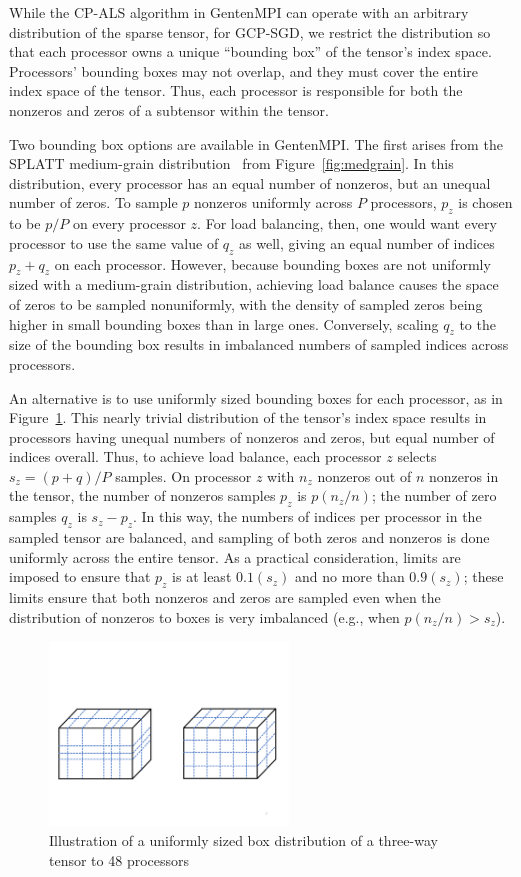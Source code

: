While the CP-ALS algorithm in GentenMPI can operate with an arbitrary 
distribution of the sparse tensor, for GCP-SGD, we restrict the distribution
so that each processor owns a unique ``bounding box'' of the tensor's
index space.  Processors' bounding boxes may not overlap, and they must cover
the entire index space of the tensor.  Thus, each processor is responsible
for both the nonzeros and zeros of a subtensor within the tensor.

Two bounding box options are available in GentenMPI.  The first arises from
the SPLATT medium-grain distribution~\cite{SK16} from 
Figure~\ref{fig:medgrain}.  In this distribution, every processor has an 
equal number of nonzeros, but an unequal number of zeros.  
To sample $p$ nonzeros uniformly across $P$ processors, $p_z$ is chosen
to be $p /P$ on every processor $z$.  For load balancing, then, one would want
every processor to use the same value of $q_z$ as well, giving 
an equal number of indices $p_z + q_z$ on each processor.
However, because bounding boxes are not uniformly sized
with a medium-grain distribution, achieving load balance causes the space
of zeros to be sampled nonuniformly, with the density of sampled zeros
being higher in small bounding boxes than in large ones.  Conversely,
scaling $q_z$ to the size of the bounding box results in imbalanced
numbers of sampled indices across processors.

An alternative is to use uniformly sized bounding boxes for each processor,
as in Figure~\ref{fig:uniformbox}.  This nearly trivial distribution of the
tensor's index space results in processors having unequal numbers of nonzeros
and zeros, but equal number of indices overall.  Thus, to achieve load balance,
each processor $z$ selects $s_z = (p+q)/P$ samples.  On processor $z$ with
$n_z$ nonzeros out of $n$ nonzeros in the tensor, the number of 
nonzeros samples $p_z$ is $p(n_z / n)$; the number of zero samples
$q_z$ is $s_z - p_z$.  
In this way, the numbers of indices per processor in the sampled tensor 
are balanced, and sampling of both zeros and nonzeros is done uniformly 
across the entire tensor.
As a practical consideration,
limits are imposed to ensure that $p_z$ is at least $0.1 (s_z)$ and 
no more than $0.9 (s_z)$; these limits ensure that both nonzeros and 
zeros are sampled even when the distribution of nonzeros to boxes is very 
imbalanced (e.g., when $p(n_z / n) > s_z$).

\begin{figure}[ht]
   \centering
   \includegraphics[keepaspectratio=true, width=2.5in]{figs/uniformbox}
   \caption[Uniformly sized box tensor distribution]{Illustration of a uniformly sized box distribution 
 of a three-way tensor to 48 processors}
   \label{fig:uniformbox}
\end{figure}

